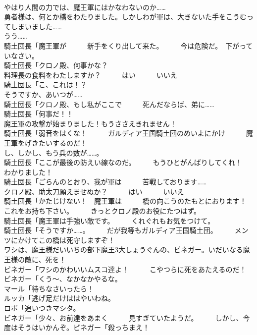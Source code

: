 \documentclass[8pt]{extreport}
\begin{document}
\begin{CJK}{UTF8}{min}
\\	やはり人間の力では、魔王軍にはかなわないのか……	
\\	勇者様は、何とか橋をわたりました。しかしわが軍は、大きないた手をこうむってしまいました……	
\\	うう……	
\\	騎土団長「魔王軍が　　　新手をくり出して来た。　　　今は危険だ。　下がっていなさい。	
\\	騎土団長「クロノ殿、何事かな？	
\\	料理長の食料をわたしますか？　　　はい　　　いいえ	
\\	騎土団長「こ、これは！？	
\\	そうですか、あいつが……	
\\	騎土団長「クロノ殿、もし私がここで　　　死んだならば、弟に……	
\\	騎土団長「何事だ！！	
\\	魔王軍の攻撃が始まりました！もうささえきれません！	
\\	騎土団長「弱音をはくな！　　　ガルディア王国騎土団のめいよにかけ　　　魔王軍をげきたいするのだ！	
\\	し、しかし、もう兵の数が……。	
\\	騎土団長「ここが最後の防えい線なのだ。　　　もうひとがんばりしてくれ！	
\\	わかりました！	
\\	騎土団長「ごらんのとおり、我が軍は　　　苦戦しております……	
\\	クロノ殿、助太刀願えませぬか？　　　はい　　　いいえ	
\\	騎土団長「かたじけない！　魔王軍は　　　橋の向こうのたもとにおります！	
\\	これをお持ち下さい。　　　きっとクロノ殿のお役にたつはず。	
\\	騎土団長「魔王軍は手強い敵です。　　　くれぐれもお気をつけて。	
\\	騎土団長「そうですか……。　　　だが我等もガルディア王国騎土団。　　　メンツにかけてこの橋は死守しますぞ！	
\\	ワシは、魔王様だいいちの部下魔王3大しょうぐんの、ビネガー。いだいなる魔王様の敵に、死を！	
\\	ビネガー「ワシのかわいいムスコ達よ！　　　こやつらに死をあたえるのだ！	
\\	ビネガー「くう～、なかなかやるな。	
\\	マール「待ちなさいったら！	
\\	ルッカ「逃げ足だけははやいわね。	
\\	ロボ「追いつきマシタ。	
\\	ビネガー「少々、お前達をあまく　　　見すぎていたようだ。　　　しかし、今度はそうはいかんぞ。ビネガー「殺っちまえ！	

\end{CJK}
\end{document}
